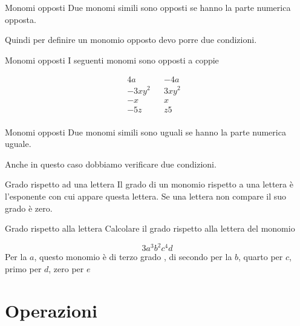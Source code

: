 \begin{definizionet}{Monomi opposti}{}
	Due monomi  simili sono opposti se hanno la parte numerica opposta.
\end{definizionet}
Quindi per definire un monomio opposto devo porre due condizioni.
\begin{esempiot}{Monomi opposti}{}
	I seguenti monomi sono opposti a coppie
\end{esempiot}
\begin{align*}
	4a&&-4a&\\
	-3xy^2&&3xy^2&\\
	-x&&x&\\
	-5z&&z5\\
\end{align*}
\begin{definizionet}{Monomi opposti}{}
	Due monomi  simili sono uguali se hanno la parte numerica uguale.
\end{definizionet}
Anche in questo caso dobbiamo verificare due condizioni.
\begin{definizionet}{Grado rispetto ad una lettera}{}
Il grado di un monomio rispetto a una lettera è l'esponente con cui appare questa lettera. Se una lettera non compare il suo grado è zero.
\end{definizionet}
\begin{esempiot}{Grado rispetto alla lettera}{}
	Calcolare il grado rispetto alla lettera del monomio
\end{esempiot}
\[3a^3b^2c^4d\] Per la $a$, questo monomio è di terzo grado , di secondo per la $b$, quarto per $c$, primo per $d$, zero per $e$
\section{Operazioni}
